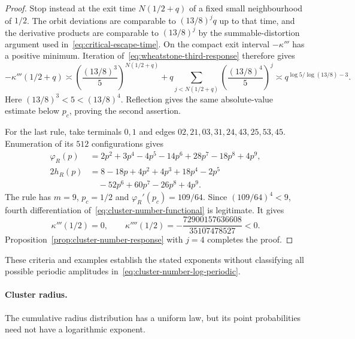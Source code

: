 \begin{proof}
Stop instead at the exit time $N(1/2+q)$ of a fixed small neighbourhood of $1/2$.
The orbit deviations are comparable to $(13/8)^j q$ up to that time, and the derivative products are comparable to $(13/8)^j$ by the summable-distortion argument used in~\eqref{eq:critical-escape-time}.
On the compact exit interval $-\kappa'''$ has a positive minimum.
Iteration of~\eqref{eq:wheatstone-third-response} therefore gives
\[
 -\kappa'''(1/2+q)\asymp
 \left(\frac{(13/8)^3}{5}\right)^{N(1/2+q)}
 +q\sum_{j<N(1/2+q)}\left(\frac{(13/8)^4}{5}\right)^j
 \asymp q^{\log5/\log(13/8)-3}.
\]
Here $(13/8)^3<5<(13/8)^4$.
Reflection gives the same absolute-value estimate below $p_c$, proving the second assertion.

For the last rule, take terminals $0,1$ and edges
$02,21,03,31,24,43,25,53,45$.
Enumeration of its $512$ configurations gives
\begin{align*}
 \varphi_R(p)&=2p^2+3p^4-4p^5-14p^6+28p^7-18p^8+4p^9,\\
 2h_R(p)&=8-18p+4p^2+4p^3+18p^4-2p^5\\
 &\quad-52p^6+60p^7-26p^8+4p^9.
\end{align*}
The rule has $m=9$, $p_c=1/2$ and $\varphi_R'(p_c)=109/64$.
Since $(109/64)^4<9$, fourth differentiation of~\eqref{eq:cluster-number-functional} is legitimate.
It gives
\[
 \kappa'''(1/2)=0,\qquad
 \kappa''''(1/2)=-\frac{72900157636608}{35107478527}<0.
\]
Proposition~\ref{prop:cluster-number-response} with $j=4$ completes the proof.
\end{proof}

These criteria and examples establish the stated exponents without classifying all possible periodic amplitudes in~\eqref{eq:cluster-number-log-periodic}.


\paragraph{Cluster radius.}
The cumulative radius distribution has a uniform law, but its point probabilities need not have a logarithmic exponent.

